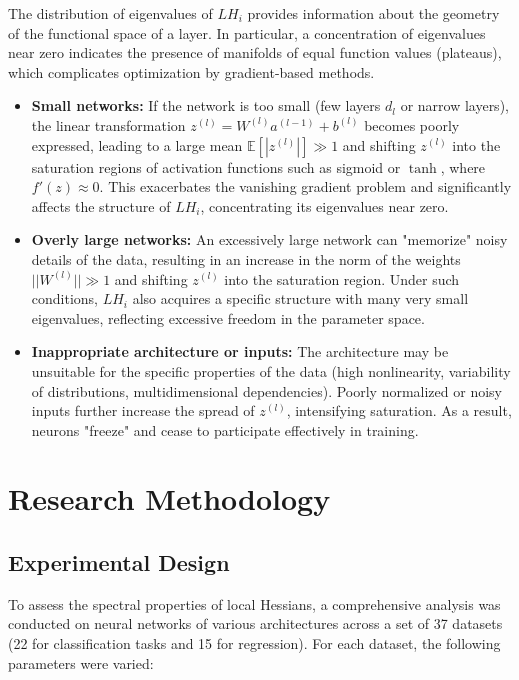\documentclass[a4paper,12pt]{article}
\begin{document}
The distribution of eigenvalues of $LH_i$ provides information about the geometry of the functional space of
a layer. In particular, a concentration of eigenvalues near zero indicates the presence of manifolds of equal
function values (plateaus), which complicates optimization by gradient-based methods.

\begin{itemize}
  \item \textbf{Small networks:} If the network is too small (few layers $d_l$ or narrow layers), the linear
    transformation $z^{(l)}=W^{(l)}a^{(l-1)}+b^{(l)}$ becomes poorly expressed, leading to a large mean
    $\mathbb{E}[|z^{(l)}|]\gg1$ and shifting $z^{(l)}$ into the saturation regions of activation functions
    such as sigmoid or $\tanh$, where $f'(z)\approx0$. This exacerbates the vanishing gradient problem and
    significantly affects the structure of $LH_i$, concentrating its eigenvalues near zero.
  \item \textbf{Overly large networks:} An excessively large network can "memorize" noisy details of the
    data, resulting in an increase in the norm of the weights $||W^{(l)}||\gg1$ and shifting $z^{(l)}$ into
    the saturation region. Under such conditions, $LH_i$ also acquires a specific structure with many very
    small eigenvalues, reflecting excessive freedom in the parameter space.
  \item \textbf{Inappropriate architecture or inputs:} The architecture may be unsuitable for the specific
    properties of the data (high nonlinearity, variability of distributions, multidimensional dependencies).
    Poorly normalized or noisy inputs further increase the spread of $z^{(l)}$, intensifying saturation. As a
    result, neurons "freeze" and cease to participate effectively in training.
\end{itemize}

\section{Research Methodology}

\subsection{Experimental Design}

To assess the spectral properties of local Hessians, a comprehensive analysis was conducted on neural
networks of various architectures across a set of 37 datasets (22 for classification tasks and 15 for
regression). For each dataset, the following parameters were varied:
\end{document}
